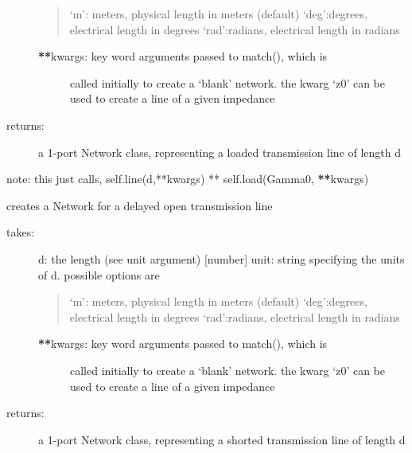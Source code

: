 \documentclass[letterpaper,10pt,english]{sphinxmanual}
\begin{document}
\begin{fulllineitems}
\begin{fulllineitems}
\begin{description}
\begin{quote}
`m': meters, physical length in meters (default)
`deg':degrees, electrical length in degrees
`rad':radians, electrical length in radians
\end{quote}
\begin{description}
\item[{{\color{red}\bfseries{}**}kwargs: key word arguments passed to match(), which is }] \leavevmode
called initially to create a `blank' network. the kwarg
`z0' can be used to create a line of a given impedance

\end{description}

\item[{returns:}] \leavevmode
a 1-port Network class, representing a loaded transmission
line of length d

\end{description}

note: this just calls,
self.line(d,**kwargs) ** self.load(Gamma0, {\color{red}\bfseries{}**}kwargs)

\end{fulllineitems}


\begin{fulllineitems}
\label{api/mwavepy.media:mwavepy.media.media.Media.delay_open}
creates a Network for a delayed open transmission line
\begin{description}
\item[{takes:}] \leavevmode
d: the length (see unit argument) {[}number{]}
unit: string specifying the units of d. possible options are
\begin{quote}

`m': meters, physical length in meters (default)
`deg':degrees, electrical length in degrees
`rad':radians, electrical length in radians
\end{quote}
\begin{description}
\item[{{\color{red}\bfseries{}**}kwargs: key word arguments passed to match(), which is }] \leavevmode
called initially to create a `blank' network. the kwarg
`z0' can be used to create a line of a given impedance

\end{description}

\item[{returns:}] \leavevmode
a 1-port Network class, representing a shorted transmission
line of length d


\end{description}
\end{fulllineitems}
\end{fulllineitems}
\end{document}
